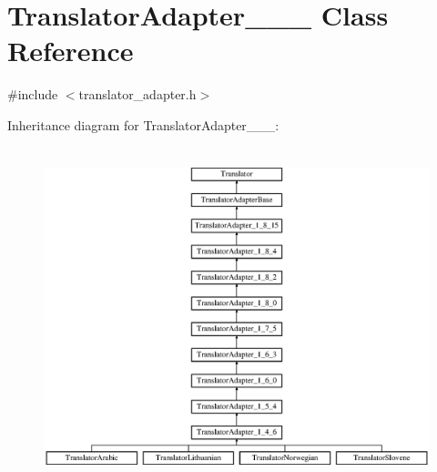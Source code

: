 \hypertarget{class_translator_adapter__1__5__4}{}\section{Translator\+Adapter\+\_\+\_\+\_ Class Reference}
\label{class_translator_adapter__1__5__4}


{\ttfamily \#include $<$translator\+\_\+adapter.\+h$>$}

Inheritance diagram for Translator\+Adapter\+\_\+\_\+\_\+:\begin{figure}[H]
\begin{center}
\leavevmode
\includegraphics[height=9.824561cm]{class_translator_adapter__1__5__4}
\end{center}
\end{figure}
